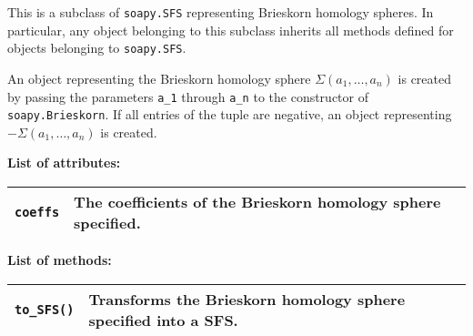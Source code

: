 \documentclass[12pt]{amsart}
\theoremstyle{definition}
\theoremstyle{remark}
\numberwithin{equation}{section}
\begin{document}
This is a subclass of \texttt{soapy.SFS} representing Brieskorn homology spheres.
In particular, any object belonging to this subclass inherits all methods defined for objects belonging to \texttt{soapy.SFS}.

An object representing the Brieskorn homology sphere $\Sigma(a_{1},\dots,a_{n})$ is created by passing the parameters \texttt{a\_1} through \texttt{a\_n} to the constructor of \texttt{soapy.Brieskorn}.
If all entries of the tuple are negative, an object representing $-\Sigma(a_{1},\dots,a_{n})$ is created.

\bigskip

\textbf{List of attributes:}

\renewcommand{\arraystretch}{1.5}%
\begin{tabularx}{\linewidth}{X X}
\hline
\texttt{coeffs} & The coefficients of the Brieskorn homology sphere specified. \phantom{aaaa aaaa aaaa}\\
\hline
\end{tabularx}

\bigskip

\textbf{List of methods:}

\renewcommand{\arraystretch}{1.5}%
\begin{tabularx}{\linewidth}{X X}
\hline
\texttt{to\_SFS()} & Transforms the Brieskorn homology sphere specified into a SFS. \phantom{aaaaaaaaaaaaaaaaaaaa}\\
\hline
\end{tabularx}
\end{document}
